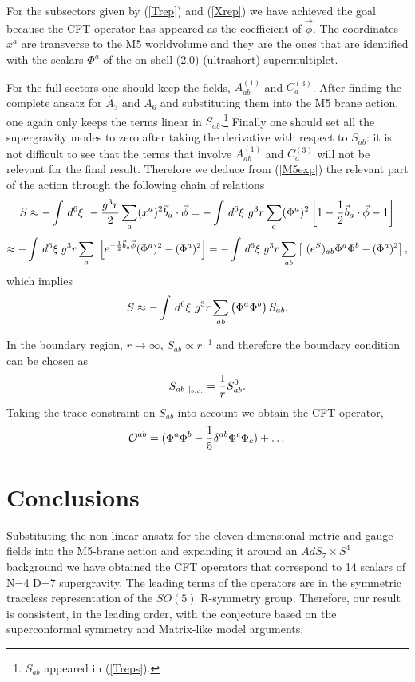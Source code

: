 \documentclass[a4paper,11pt]{article}
\begin{document}
For the subsectors given by (\ref{Trep}) and (\ref{Xrep}) we have
achieved the goal because the CFT operator has appeared as the
coefficient of $\vec{\phi}$. The coordinates $x^a$ are transverse
to the M5 worldvolume and they are the ones that are identified
with the scalars $\Phi^a$ of the on-shell (2,0) (ultrashort)
supermultiplet.

For the full sectors one should keep the fields, $A^{(1)}_{ab}$
and $C^{(3)}_{a}$. After finding the complete ansatz for
$\hat{A}_3$ and $\hat{A}_6$ and substituting them into the M5
brane action, one again only keeps the terms linear in
$S_{ab}$.\footnote{$S_{ab}$ appeared in (\ref{Treps}).} Finally
one should set all the supergravity modes to zero after taking the
derivative with respect to $S_{ab}$: it is not difficult to see
that the terms that involve $A^{(1)}_{ab}$ and $C^{(3)}_{a}$ will
not be relevant for the final result. Therefore we deduce from
(\ref{M5exp}) the relevant part of the action through the
following chain of relations
$$
S\approx -\int\,d^6\xi~-{g^3 r\over 2}\sum_a (x^a)^2 \vec{b}_a\cdot \vec{\phi}
=-\int\,d^6\xi~g^3 r\sum_a (\Phi^a)^2\left[1-{1\over 2}\vec{b}_a\cdot
\vec{\phi}-1 \right]
$$
$$
\approx -\int\,d^6\xi~g^3 r \sum_a~ \left[e^{-{1\over 2}\vec{b}_a
\vec{\phi}}(\Phi^a)^2-(\Phi^a)^2\right]=-\int\,d^6\xi~g^3 r
\sum_{ab}\left[~(e^S)_{ab} \Phi^a \Phi^b -(\Phi^a)^2\right],
$$
which implies
\begin{equation}\plabel{corr}
S\approx -\int\,d^6\xi~g^3 r  \sum_{ab}
\left( \Phi^a \Phi^b\right)S_{ab}.
\end{equation}

In the boundary region, $r\rightarrow \infty$, $S_{ab}\propto
r^{-1}$ and therefore the boundary condition can be chosen as
\begin{equation}\plabel{Sbc}
S_{ab~\vert_{b.c.}}={1\over r}S^{0}_{ab}.
\end{equation}
Taking the trace constraint on $S_{ab}$ into account we obtain the
CFT operator,
\begin{equation}\plabel{CFT}
{\cal O}^{ab}=(\Phi^a \Phi^b-{1\over 5}\d^{ab}\Phi^c \Phi_c)+\dots
\end{equation}




\section{Conclusions}


Substituting the non-linear ansatz for the eleven-dimensional metric and
 gauge fields into the M5-brane action and expanding it around an
$AdS_7\times S^4$ background we have obtained the CFT
 operators that correspond
to 14 scalars of N=4 D=7 supergravity. The leading terms of the
operators are in the symmetric
traceless representation of the $SO(5)$ R-symmetry group. Therefore,
 our result is consistent, in the leading order, with
the conjecture based on the
superconformal symmetry and Matrix-like model arguments.
\end{document}
